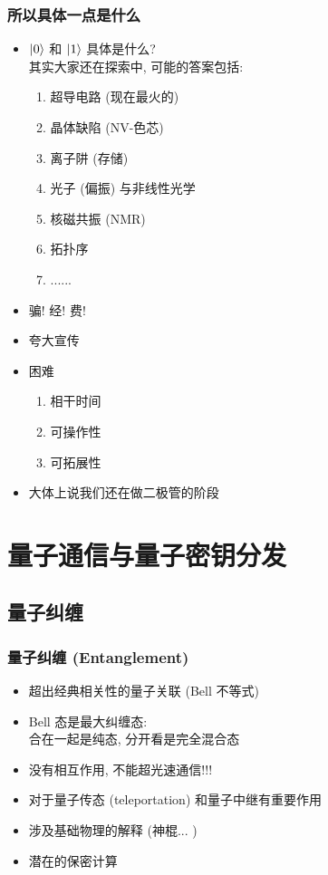 \documentclass[12pt,hyperref={CJKbookmarks=true},aspectratio=169]{beamer}
\begin{document}
\begin{frame}[t]\frametitle{所以具体一点是什么}
\begin{minipage}[t]{0.6\linewidth}
\begin{itemize}
	\item $\ket 0$ 和 $\ket 1$ 具体是什么? \\
	其实大家还在探索中, 可能的答案包括: 
	\begin{enumerate}
		\item 超导电路 (现在最火的)
		\item 晶体缺陷 (NV-色芯)
		\item 离子阱 (存储)
		\item 光子 (偏振) 与非线性光学
		\item 核磁共振 (NMR)
		\item 拓扑序
		\item ......
	\end{enumerate}
\end{itemize}
\end{minipage}%
\begin{minipage}[t]{0.4\linewidth}
\begin{itemize}
	\item 骗! 经! 费!
	\item 夸大宣传
	\item 困难
	\begin{enumerate}
		\item 相干时间
		\item 可操作性
		\item 可拓展性
	\end{enumerate}
	\item 大体上说我们还在做二极管的阶段
\end{itemize}
\end{minipage}
\end{frame}

\section{量子通信与量子密钥分发}

\subsection{量子纠缠}
\begin{frame}[t]\frametitle{量子纠缠 (Entanglement)}
\begin{itemize}
	\item 超出经典相关性的量子关联 (Bell 不等式)
	\item Bell 态是最大纠缠态: \\
	合在一起是纯态, 分开看是完全混合态
	\item 没有相互作用, 不能超光速通信!!! 
	\item 对于量子传态 (teleportation) 和量子中继有重要作用
	\item 涉及基础物理的解释 (神棍... )
	\item 潜在的保密计算
\end{itemize}
\end{frame}
\end{document}
